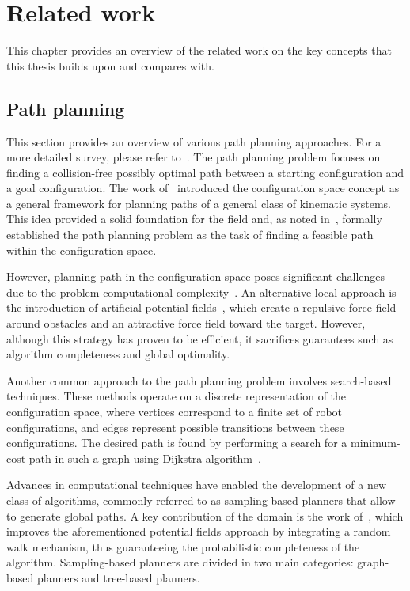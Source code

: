 \chapter{Related work}\label{chap:related_work}

This chapter provides an overview of the related work on the key concepts that this thesis builds upon and compares with.

\section{Path planning}

This section provides an overview of various path planning approaches. 
For a more detailed survey, please refer to~\cite{cLavalle, cFrazzoli, cKavraki}.
The path planning problem focuses on finding a collision-free possibly optimal path between a starting configuration and a goal configuration. 
The work of~\cite{cConfigSpace} introduced the configuration space concept as a general framework for planning paths of a general class of kinematic systems.
This idea provided a solid foundation for the field and, as noted in~\cite{cSpatialPlan}, formally established the path planning problem as the task of finding a feasible path within the configuration space.

However, planning path in the configuration space poses significant challenges due to the problem computational complexity~\cite{cComplexity}. 
An alternative local approach is the introduction of artificial potential fields~\cite{cAPF}, which create a repulsive force field around obstacles and an attractive force field toward the target.
However, although this strategy has proven to be efficient, it sacrifices guarantees such as algorithm completeness and global optimality.

Another common approach to the path planning problem involves search-based techniques. 
These methods operate on a discrete representation of the configuration space, where vertices correspond to a finite set of robot configurations, and edges represent possible transitions between these configurations.
The desired path is found by performing a search for a minimum-cost path in such a graph using Dijkstra algorithm~\cite{cDijk}. 

Advances in computational techniques have enabled the development of a new class of algorithms, commonly referred to as sampling-based planners that allow to generate global paths.
A key contribution of the domain is the work of~\cite{cLatombe}, which improves the aforementioned potential fields approach by integrating a random walk mechanism, thus guaranteeing the probabilistic completeness of the algorithm.
Sampling-based planners are divided in two main categories: graph-based planners and tree-based planners.


